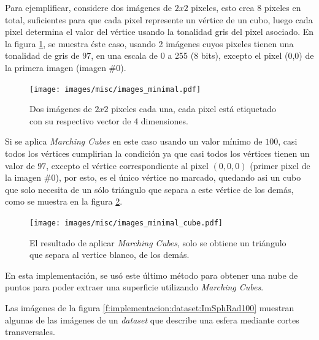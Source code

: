 Para ejemplificar, considere dos imágenes de $2x2$ pixeles, esto crea 8 pixeles en total, suficientes para que cada pixel represente un vértice de un cubo, luego cada pixel determina el valor del vértice usando la tonalidad gris del pixel asociado. En la figura \ref{f:implementacion:images_minimal}, se muestra éste caso, usando 2 imágenes cuyos pixeles tienen una tonalidad de gris de 97, en una escala de 0 a 255 (8 bits), excepto el pixel (0,0) de la primera imagen (imagen \#0).

\begin{figure}[!hbt]
	\centering
	\texttt{[image: images/misc/images\_minimal.pdf]}
	\caption{Dos imágenes de $2x2$ pixeles cada una, cada pixel está etiquetado con su respectivo vector de 4 dimensiones.}
	\label{f:implementacion:images_minimal}
\end{figure}

Si se aplica \emph{Marching Cubes} en este caso usando un valor mínimo de $100$, casi todos los vértices cumplirian la condición ya que casi todos los vértices tienen un valor de $97$, excepto el vértice correspondiente al pixel $(0,0,0)$ (primer pixel de la imagen \#0), por esto, es el único vértice no marcado, quedando asi un cubo que solo necesita de un sólo triángulo que separa a este vértice de los demás, como se muestra en la figura \ref{f:implementacion:images_minimal_cube}.

\begin{figure}[!hbt]
	\centering
	\texttt{[image: images/misc/images\_minimal\_cube.pdf]}
	\caption{El resultado de aplicar \emph{Marching Cubes}, solo se obtiene un triángulo que separa al vertice blanco, de los demás.}
	\label{f:implementacion:images_minimal_cube}
\end{figure}

\pagebreak
En esta implementación, se usó este último método para obtener una nube de puntos para poder extraer una superficie utilizando \emph{Marching Cubes}.

Las imágenes de la figura \ref{f:implementacion:dataset:ImSphRad100} muestran algunas de las imágenes de un \emph{dataset} que describe una esfera mediante cortes transversales.

